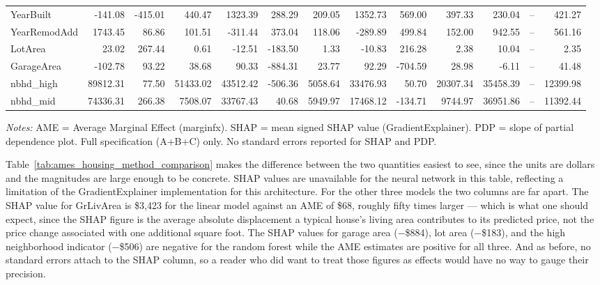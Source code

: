 \documentclass[12pt]{article}
\begin{document}
\begin{table}
\begin{threeparttable}
\begin{tabular}{lrrrrrrrrrrrr}
				YearBuilt & -141.08 & -415.01 & 440.47 & 1323.39 & 288.29 & 209.05 & 1352.73 & 569.00 & 397.33 & 230.04 & -- & 421.27 \\
				YearRemodAdd & 1743.45 & 86.86 & 101.51 & -311.44 & 373.04 & 118.06 & -289.89 & 499.84 & 152.00 & 942.55 & -- & 561.16 \\
				\midrule
				LotArea & 23.02 & 267.44 & 0.61 & -12.51 & -183.50 & 1.33 & -10.83 & 216.28 & 2.38 & 10.04 & -- & 2.35 \\
				GarageArea & -102.78 & 93.22 & 38.68 & 90.33 & -884.31 & 23.77 & 92.29 & -704.59 & 28.98 & -6.11 & -- & 41.48 \\
				nbhd\_high & 89812.31 & 77.50 & 51433.02 & 43512.42 & -506.36 & 5058.64 & 33476.93 & 50.70 & 20307.34 & 35458.39 & -- & 12399.98 \\
				nbhd\_mid & 74336.31 & 266.38 & 7508.07 & 33767.43 & 40.68 & 5949.97 & 17468.12 & -134.71 & 9744.97 & 36951.86 & -- & 11392.44 \\
				\bottomrule
				\end{tabular}
				\begin{tablenotes}
				\footnotesize
				\item \textit{Notes:} AME = Average Marginal Effect (marginfx). SHAP = mean signed SHAP value (GradientExplainer). PDP = slope of partial dependence plot. Full specification (A+B+C) only. No standard errors reported for SHAP and PDP.
				\end{tablenotes}
		\end{threeparttable}
	\end{table}
	
	Table~\ref{tab:ames_housing_method_comparison} makes the difference between the two quantities easiest to see, since the units are dollars and the magnitudes are large enough to be concrete. SHAP values are unavailable for the neural network in this table, reflecting a limitation of the GradientExplainer implementation for this architecture. For the other three models the two columns are far apart. The SHAP value for GrLivArea is \$3,423 for the linear model against an AME of \$68, roughly fifty times larger --- which is what one should expect, since the SHAP figure is the average absolute displacement a typical house's living area contributes to its predicted price, not the price change associated with one additional square foot. The SHAP values for garage area ($-$\$884), lot area ($-$\$183), and the high neighborhood indicator ($-$\$506) are negative for the random forest while the AME estimates are positive for all three. And as before, no standard errors attach to the SHAP column, so a reader who did want to treat those figures as effects would have no way to gauge their precision.
\end{document}
